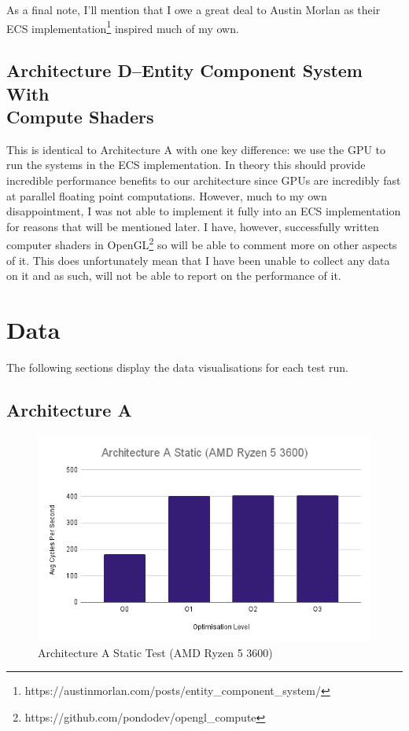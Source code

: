 \documentclass{article}
\begin{document}
As a final note, I'll mention that I owe a great deal to Austin Morlan as their
ECS implementation\footnote{https://austinmorlan.com/posts/entity\_component\_system/}
inspired much of my own.

\subsection{Architecture D--Entity Component System With\\Compute Shaders}
This is identical to Architecture A with one key difference: we use the GPU to
run the systems in the ECS implementation. In theory this should provide
incredible performance benefits to our architecture since GPUs are incredibly
fast at parallel floating point computations. However, much to my own 
disappointment, I was not able to implement it fully into an ECS implementation
for reasons that will be mentioned later. I have, however, successfully written
computer shaders in OpenGL\footnote{https://github.com/pondodev/opengl\_compute}
so will be able to comment more on other aspects of it. This does unfortunately
mean that I have been unable to collect any data on it and as such, will not be
able to report on the performance of it.

\clearpage

\section{Data}
The following sections display the data visualisations for each test run.

\subsection{Architecture A}
\begin{figure}[!h]
\centering
\includegraphics[scale=0.5]{Architecture A Static (AMD Ryzen 5 3600).png}
\caption{Architecture A Static Test (AMD Ryzen 5 3600)}
\label{arch_a_static_pc}
\end{figure}
\end{document}
